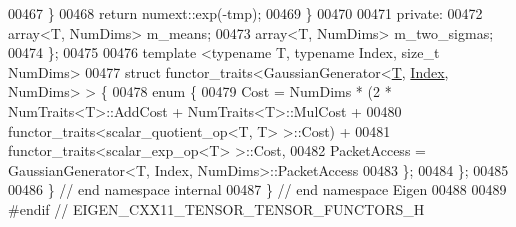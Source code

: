 \begin{DoxyCode}
00467     \}
00468     \textcolor{keywordflow}{return} numext::exp(-tmp);
00469   \}
00470 
00471  \textcolor{keyword}{private}:
00472   array<T, NumDims> m\_means;
00473   array<T, NumDims> m\_two\_sigmas;
00474 \};
00475 
00476 \textcolor{keyword}{template} <\textcolor{keyword}{typename} T, \textcolor{keyword}{typename} Index, \textcolor{keywordtype}{size\_t} NumDims>
00477 \textcolor{keyword}{struct }functor\_traits<GaussianGenerator<\hyperlink{group___sparse_core___module_class_eigen_1_1_triplet}{T}, \hyperlink{namespace_eigen_a62e77e0933482dafde8fe197d9a2cfde}{Index}, NumDims> > \{
00478   \textcolor{keyword}{enum} \{
00479     Cost = NumDims * (2 * NumTraits<T>::AddCost + NumTraits<T>::MulCost +
00480                       functor\_traits<scalar\_quotient\_op<T, T> >::Cost) +
00481            functor\_traits<scalar\_exp\_op<T> >::Cost,
00482     PacketAccess = GaussianGenerator<T, Index, NumDims>::PacketAccess
00483   \};
00484 \};
00485 
00486 \} \textcolor{comment}{// end namespace internal}
00487 \} \textcolor{comment}{// end namespace Eigen}
00488 
00489 \textcolor{preprocessor}{#endif // EIGEN\_CXX11\_TENSOR\_TENSOR\_FUNCTORS\_H}
\end{DoxyCode}
